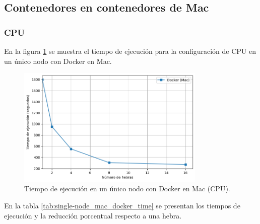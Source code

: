 

\subsection{Contenedores en contenedores de Mac}
\subsubsection{CPU}

En la figura \ref{fig:single-node_mac_docker_time} se muestra el tiempo de ejecución para la configuración de CPU en un único nodo con Docker en Mac.

\begin{figure}[H]
    \centering
    \includegraphics[width=0.8\textwidth]{imagenes/cap5/single-node_mac_docker_time.png}
    \caption{Tiempo de ejecución en un único nodo con Docker en Mac (CPU).}
    \label{fig:single-node_mac_docker_time}
\end{figure}

En la tabla \ref{tab:single-node_mac_docker_time} se presentan los tiempos de ejecución y la reducción porcentual respecto a una hebra.

